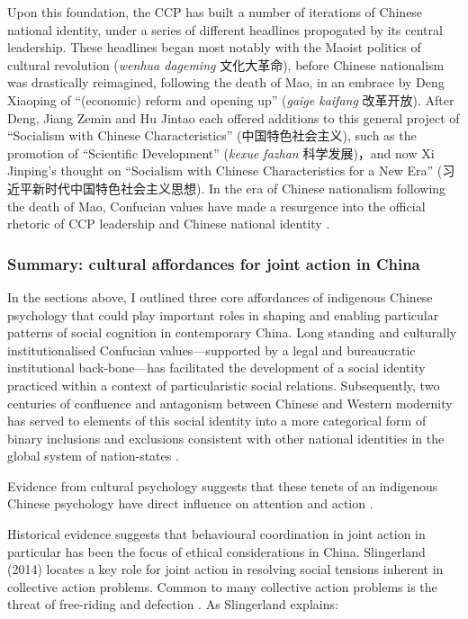 \begin{CJK}{UTF8}{gbsn}
Upon this foundation, the CCP has built a number of iterations of Chinese national identity, under a series of different headlines propogated by its central leadership. These headlines began most notably with the Maoist politics of cultural revolution (\textit{wenhua dageming} 文化大革命), before Chinese nationalism was drastically reimagined, following the death of Mao, in an embrace by Deng Xiaoping of ``(economic) reform and opening up'' (\textit{gaige kaifang} 改革开放).  After Deng, Jiang Zemin and Hu Jintao each offered additions to this general project of ``Socialism with Chinese Characteristics'' (中国特色社会主义), such as the promotion of ``Scientific Development'' (\textit{kexue fazhan} 科学发展)，and now Xi Jinping's thought on ``Socialism with Chinese Characteristics for a New Era'' (习近平新时代中国特色社会主义思想). In the era of Chinese nationalism following the death of Mao, Confucian values have made a resurgence into the official rhetoric of CCP leadership and Chinese national identity \citep{Billioud2007}.

\subsubsection{Summary: cultural affordances for joint action in China}

In the sections above, I outlined three core affordances of indigenous Chinese psychology that could play important roles in shaping and enabling particular patterns of social cognition in contemporary China.  Long standing and culturally institutionalised Confucian values---supported by a legal and bureaucratic institutional back-bone---has facilitated the development of a social identity practiced within a context of particularistic social relations.  Subsequently, two centuries of confluence and antagonism between Chinese and Western modernity has served to elements of this social identity into a more categorical form of binary inclusions and exclusions consistent with other national identities in the global system of nation-states \citep{Liu2009}.

Evidence from cultural psychology suggests that these tenets of an indigenous Chinese psychology have direct influence on attention and action \citep{Nisbett2001}.




Historical evidence suggests that behavioural coordination in joint action in particular has been the focus of ethical considerations in China.  Slingerland (2014) locates a key role for joint action in resolving social tensions inherent in collective action problems.  Common to many collective action problems is the threat of free-riding and defection \citep{Cosmides2013}.  As Slingerland explains:


\end{CJK}
